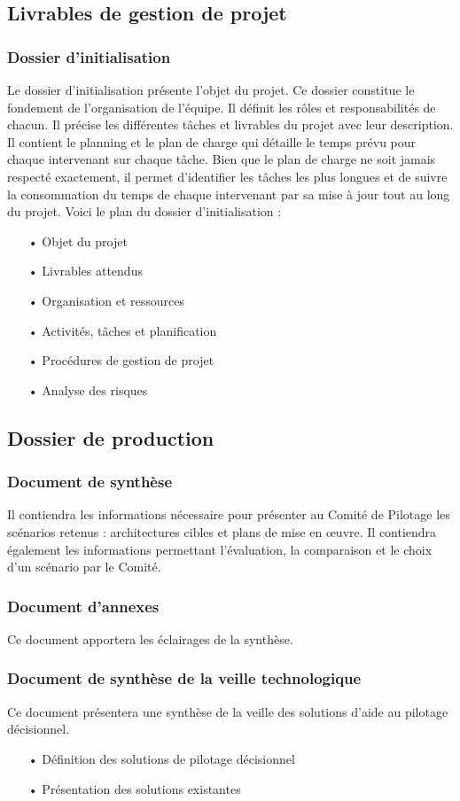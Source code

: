 \subsection{Livrables de gestion de projet}
\subsubsection{Dossier d'initialisation}
Le dossier d'initialisation présente l'objet du projet. Ce dossier constitue le fondement de l'organisation de l'équipe. Il définit les rôles et responsabilités de chacun. Il précise les différentes tâches et livrables du projet avec leur description. Il contient le planning et le plan de charge qui détaille le temps prévu pour chaque intervenant sur chaque tâche.
Bien que le plan de charge ne soit jamais respecté exactement, il permet d'identifier les tâches les plus longues et de suivre la consommation du temps de chaque intervenant par sa mise à jour tout au long du projet. Voici le plan du dossier d'initialisation :
\begin{itemize}
\item[•]Objet du projet
\item[•]Livrables attendus
\item[•]Organisation et ressources
\item[•]Activités, tâches et planification
\item[•]Procédures de gestion de projet
\item[•]Analyse des risques
\end{itemize}

\subsection{Dossier de production}
\subsubsection{Document de synthèse}
Il contiendra les informations nécessaire pour présenter au Comité de Pilotage les scénarios retenus : architectures cibles et plans de mise en œuvre. Il contiendra également les informations permettant l'évaluation, la comparaison et le choix d'un scénario par le Comité.
\subsubsection{Document d'annexes}
Ce document apportera les éclairages de la synthèse. 
\subsubsection{Document de synthèse de la veille technologique}
Ce document présentera une synthèse de la veille des solutions d'aide au pilotage décisionnel.
\begin{itemize}
\item[•]Définition des solutions de pilotage décisionnel
\item[•]Présentation des solutions existantes 
\end{itemize}
